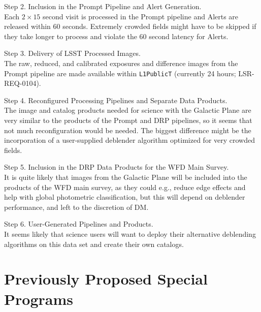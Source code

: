 \documentclass[DM,lsstdoc,toc]{lsstdoc}
\begin{document}
Step 2. Inclusion in the Prompt Pipeline and Alert Generation. \\
Each $2\times15$ second visit is processed in the Prompt pipeline and Alerts are released within 60 seconds. Extremely crowded fields might have to be skipped if they take longer to process and violate the $60$ second latency for Alerts. 

Step 3. Delivery of LSST Processed Images. \\
The raw, reduced, and calibrated exposures and difference images from the Prompt pipeline are made available within  \texttt{L1PublicT} (currently 24 hours; LSR-REQ-0104).

Step 4. Reconfigured Processing Pipelines and Separate Data Products. \\
The image and catalog products needed for science with the Galactic Plane are very similar to the products of the Prompt and DRP pipelines, so it seems that not much reconfiguration would be needed. The biggest difference might be the incorporation of a user-supplied deblender algorithm optimized for very crowded fields.

Step 5. Inclusion in the DRP Data Products for the WFD Main Survey. \\
It is quite likely that images from the Galactic Plane will be included into the products of the WFD main survey, as they could e.g., reduce edge effects and help with global photometric classification, but this will depend on deblender performance, and left to the discretion of DM. 

Step 6. User-Generated Pipelines and Products. \\
It seems likely that science users will want to deploy their alternative deblending algorithms on this data set and create their own catalogs.

%


\clearpage





\clearpage
\appendix

\section{Previously Proposed Special Programs}\label{sec:data_prev}
\end{document}
